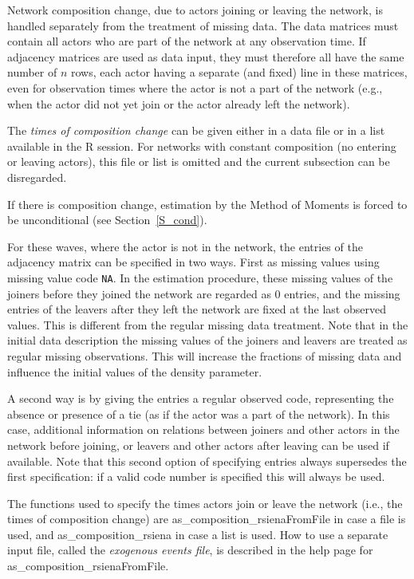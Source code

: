 \documentclass[a4paper,fleqn,11pt]{article}
\newcommand{\+}{\, + \,}
\newcommand{\sfn}[1]{\textsf{#1}}
\newcommand{\R}{{\sf R }}
\begin{document}
Network composition change, due to actors joining or leaving the
network, is handled separately from the treatment of missing data.
The data matrices must contain all actors who are part of the
network at any observation time.
If adjacency matrices are used as data input, they must therefore
all have the same number of $n$ rows, each actor
having a separate (and fixed) line in these matrices, even for
observation times where the actor is not a part of the network
(e.g., when the actor did not yet join or the actor already left
the network).

The \emph{times of composition change} can be given
either in a data file or in a list available in the \R session.
For networks with constant composition
(no entering or leaving actors), this file or list is
omitted and the current subsection can be disregarded.

If there is composition change, estimation by the Method of Moments
is forced to be unconditional (see Section~\ref{S_cond}).

For these waves, where the actor is not in the network, the entries
of the adjacency matrix can be specified in two ways. First as
missing values using missing value code \texttt{NA}. In the estimation
procedure, these missing values of the joiners before they joined
the network are regarded as 0 entries, and the missing entries of
the leavers after they left the network are fixed at the last
observed values. This is different from the regular missing data
treatment. Note that in the initial data description the missing
values of the joiners and leavers are treated as regular missing
observations. This will increase the fractions of missing data and
influence the initial values of the density parameter.

A second way is by giving the entries a regular observed code,
representing the absence or presence of a tie (as
if the actor was a part of the network). In this case, additional
information on relations between joiners and other actors in the
network before joining, or leavers and other actors after leaving
can be used if available. Note that this second option of
specifying entries always supersedes the first specification: if a
valid code number is specified this will always be used.

The functions used to specify the times actors
join or leave the network (i.e., the times of composition change)
are \sfn{as\_composition\_rsienaFromFile} in case a file is used,
and \sfn{as\_composition\_rsiena} in case a list is used.
How to use a separate input file,
called the \emph{exogenous events file}, is
described in the help page for \sfn{as\_composition\_rsienaFromFile}.
\end{document}
